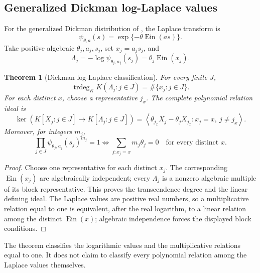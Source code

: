 \documentclass[11pt]{article}
\theoremstyle{keio}
\newtheorem{theorem}{Theorem}[section]
\theoremstyle{definition}
\theoremstyle{remark}
\newcommand{\Ein}{\operatorname{Ein}}
\newcommand{\trdeg}{\operatorname{trdeg}}
\begin{document}
\subsection*{Generalized Dickman log-Laplace values}

For the generalized Dickman distribution of
\cite{GrahovacEtAl2024}, the Laplace transform is
\begin{equation}\label{eq:Dickman-Laplace}
 \psi_{\theta,a}(s)=\exp\{-\theta\Ein(as)\}.
\end{equation}
Take positive algebraic \(\theta_j,a_j,s_j\), set \(x_j=a_js_j\), and
\[
 \Lambda_j=-\log\psi_{\theta_j,a_j}(s_j)=\theta_j\Ein(x_j).
\]

\begin{theorem}[Dickman log-Laplace classification]
\label{thm:Dickman-classification}
For every finite \(J\),
\begin{equation}\label{eq:Dickman-trdeg}
 \boxed{\displaystyle
 \trdeg_KK(\Lambda_j:j\in J)=\#\{x_j:j\in J\}.}
\end{equation}
For each distinct \(x\), choose a representative \(j_x\).  The complete
polynomial relation ideal is
\begin{equation}\label{eq:Dickman-relation-ideal}
 \ker\!\left(K[X_j:j\in J]\to K[\Lambda_j:j\in J]\right)
 =
 \left\langle
 \theta_{j_x}X_j-\theta_jX_{j_x}:
 x_j=x,\ j\ne j_x
 \right\rangle.
\end{equation}
Moreover,
for integers \(m_j\),
\begin{equation}\label{eq:Dickman-multiplicative}
 \boxed{\displaystyle
 \prod_{j\in J}\psi_{\theta_j,a_j}(s_j)^{m_j}=1
 \Longleftrightarrow
 \sum_{j:x_j=x}m_j\theta_j=0
 \quad\text{for every distinct }x.}
\end{equation}
\end{theorem}

\begin{proof}
Choose one representative for each distinct \(x_j\).  The corresponding
\(\Ein(x_j)\) are algebraically independent; every \(\Lambda_j\) is a nonzero
algebraic multiple of its block representative.  This proves the
transcendence degree and the linear defining ideal.  The Laplace values are
positive real numbers, so a multiplicative relation equal to one is
equivalent, after the real logarithm, to a linear relation among the
distinct \(\Ein(x)\); algebraic independence forces the displayed block
conditions.
\end{proof}

The theorem classifies the logarithmic values and the multiplicative
relations equal to one.  It does not claim to classify every polynomial
relation among the Laplace values themselves.
\end{document}
